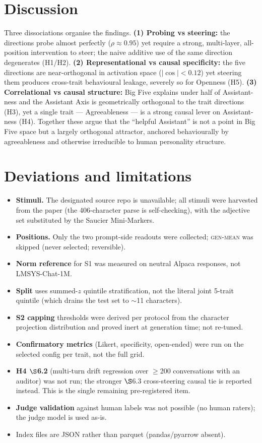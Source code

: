 \documentclass[11pt]{article}
\begin{document}
\section{Discussion}
Three dissociations organise the findings. \textbf{(1) Probing vs steering:} the
directions probe almost perfectly ($\rho{\approx}0.95$) yet require a strong,
multi-layer, all-position intervention to steer; the naive additive use of the
same direction degenerates (H1/H2). \textbf{(2) Representational vs causal
specificity:} the five directions are near-orthogonal in activation space
($|\cos|<0.12$) yet steering them produces cross-trait behavioural leakage,
severely so for Openness (H5). \textbf{(3) Correlational vs causal structure:}
Big Five explains under half of Assistant-ness and the Assistant Axis is
geometrically orthogonal to the trait directions (H3), yet a single trait
--- Agreeableness --- is a strong causal lever on Assistant-ness (H4). Together
these argue that the ``helpful Assistant'' is not a point in Big Five space but a
largely orthogonal attractor, anchored behaviourally by agreeableness and
otherwise irreducible to human personality structure.

\section{Deviations and limitations}
\begin{itemize}
  \item \textbf{Stimuli.} The designated source repo is unavailable; all stimuli
        were harvested from the paper (the 406-character parse is self-checking),
        with the adjective set substituted by the Saucier Mini-Markers.
  \item \textbf{Positions.} Only the two prompt-side readouts were collected;
        \textsc{gen-mean} was skipped (never selected; reversible).
  \item \textbf{Norm reference} for S1 was measured on neutral Alpaca responses,
        not LMSYS-Chat-1M.
  \item \textbf{Split} uses summed-$z$ quintile stratification, not the literal
        joint 5-trait quintile (which drains the test set to $\sim$11 characters).
  \item \textbf{S2 capping} thresholds were derived per protocol from the
        character projection distribution and proved inert at generation time;
        not re-tuned.
  \item \textbf{Confirmatory metrics} (Likert, specificity, open-ended) were run
        on the selected config per trait, not the full grid.
  \item \textbf{H4 $\S$6.2} (multi-turn drift regression over $\ge$200
        conversations with an auditor) was not run; the stronger $\S$6.3
        cross-steering causal tie is reported instead. This is the single
        remaining pre-registered item.
  \item \textbf{Judge validation} against human labels was not possible (no human
        raters); the judge model is used as-is.
  \item Index files are JSON rather than parquet (pandas/pyarrow absent).
\end{itemize}
\end{document}
